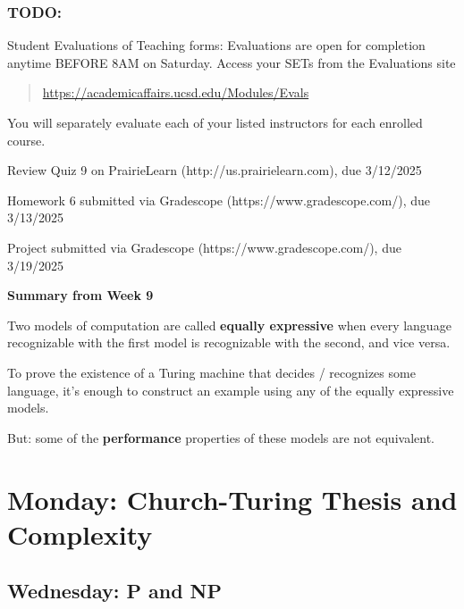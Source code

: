 \vspace{-20pt}

\subsubsection*{TODO:}
\begin{list}{\itemsep-10pt}
   \item Student Evaluations of Teaching forms: Evaluations are open for completion anytime BEFORE 8AM on Saturday.
    Access your SETs from the Evaluations site
    \begin{quote}
         \url{https://academicaffairs.ucsd.edu/Modules/Evals}
    \end{quote}
    You will separately evaluate each of your listed instructors for each enrolled course.
    \item Review Quiz 9 on PrairieLearn (http://us.prairielearn.com), due 3/12/2025
    \item Homework 6 submitted via Gradescope (https://www.gradescope.com/), due 3/13/2025
    \item Project submitted via Gradescope (https://www.gradescope.com/), due 3/19/2025
\end{list}

\newpage


{\bf Summary from Week 9}

Two models of computation are called {\bf equally expressive} when 
every language recognizable with the first model is recognizable with the second, and vice versa.

To prove the existence of a Turing machine that decides / recognizes some language, 
it's enough to construct an example using any of the equally expressive models.

But: some of the {\bf performance} properties of these models are not equivalent.

\section*{Monday: Church-Turing Thesis and Complexity}


    
\newpage
\subsection*{Wednesday: P and NP}




